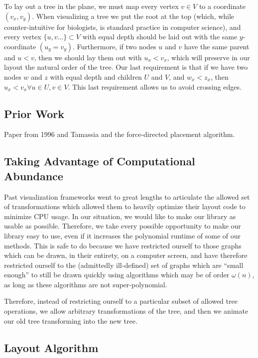 \documentclass{article}
\begin{document}
To lay out a tree in the plane, we must map every vertex $v \in V$ to a
coordinate $(v_x, v_y)$.  When visualizing a tree we put the root at the top
(which, while counter-intuitive for biologists, is standard practice in
computer science), and every vertex $\{u,v \ldots\} \subset V$ with equal depth
should be laid out with the same $y$-coordinate $(u_y = v_y)$.  Furthermore, if
two nodes $u$ and $v$ have the same parent and $u < v$, then we should lay them
out with $u_x < v_x$, which will preserve in our layout the natural order of the tree.  Our last requirement is that if we have two nodes $w$ and $z$ with equal depth and children $U$ and $V$, and $w_x < z_x$, then $u_x < v_x \forall u\in U, v\in V$.  This last requirement allows us to avoid crossing edges.

\subsection{Prior Work}

Paper from 1996 and Tamassia and the force-directed placement algorithm\cite{fdp}.

\subsection{Taking Advantage of Computational Abundance}

Past visualization frameworks went to great lengths to articulate the allowed
set of transformations which allowed them to heavily optimize their layout code
to minimize CPU usage.  In our situation, we would like to make our library as
usable as possible.  Therefore, we take every possible opportunity to make our
library easy to use, even if it increases the polynomial runtime of some of our
methods.  This is safe to do because we have restricted ourself to those graphs
which can be drawn, in their entirety, on a computer screen, and have therefore
restricted ourself to the (admittedly ill-defined) set of graphs which are
``small enough'' to still be drawn quickly using algorithms which may be of
order $\omega(n)$, as long as these algorithms are not super-polynomial.

Therefore, instead of restricting ourself to a particular subset of allowed
tree operations, we allow arbitrary transformations of the tree, and then we
animate our old tree transforming into the new tree.

\subsection{Layout Algorithm}
\end{document}
